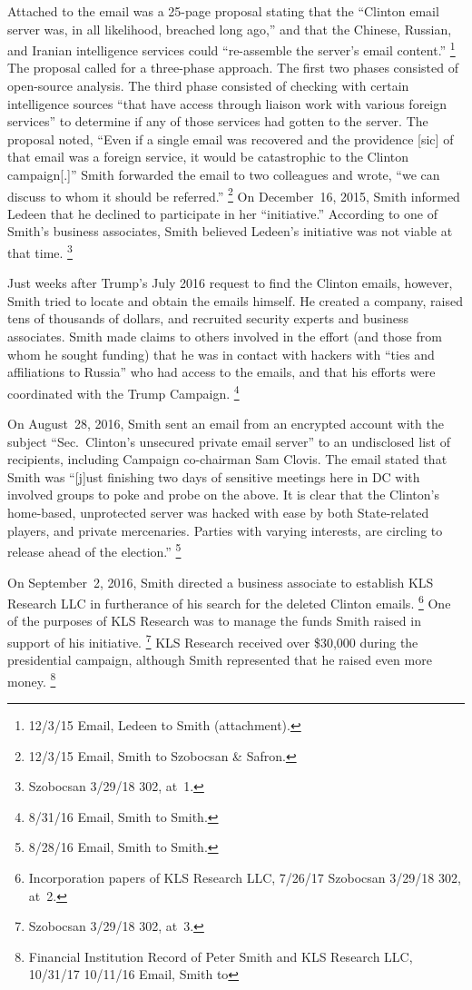 Attached to the email was a 25-page proposal stating that the ``Clinton email server was, in all likelihood, breached long ago,'' and that the Chinese, Russian, and Iranian intelligence services could ``re-assemble the server's email content.''%
\footnote{12/3/15 Email, Ledeen to Smith (attachment).}
The proposal called for a three-phase approach.
The first two phases consisted of open-source analysis.
The third phase consisted of checking with certain intelligence sources ``that have access through liaison work with various foreign services'' to determine if any of those services had gotten to the server.
The proposal noted, ``Even if a single email was recovered and the providence [sic] of that email was a foreign service, it would be catastrophic to the Clinton campaign[.]''
Smith forwarded the email to two colleagues and wrote, ``we can discuss to whom it should be referred.''%
\footnote{12/3/15 Email, Smith to Szobocsan \& Safron.}
On December~16, 2015, Smith informed Ledeen that he declined to participate in her ``initiative.''
According to one of Smith's business associates, Smith believed Ledeen's initiative was not viable at that time.%
\footnote{Szobocsan 3/29/18 302, at~1.}

Just weeks after Trump's July 2016 request to find the Clinton emails, however, Smith tried to locate and obtain the emails himself.
He created a company, raised tens of thousands of dollars, and recruited security experts and business associates.
Smith made claims to others involved in the effort (and those from whom he sought funding) that he was in contact with hackers with ``ties and affiliations to Russia'' who had access to the emails, and that his efforts were coordinated with the Trump Campaign.%
\footnote{8/31/16 Email, Smith to Smith.}

On August~28, 2016, Smith sent an email from an encrypted account with the subject ``Sec.~Clinton's unsecured private email server'' to an undisclosed list of recipients, including Campaign co-chairman Sam Clovis.
The email stated that Smith was ``[j]ust finishing two days of sensitive meetings here in DC with involved groups to poke and probe on the above.
It is clear that the Clinton's home-based, unprotected server was hacked with ease by both State-related players, and private mercenaries.
Parties with varying interests, are circling to release ahead of the election.''%
\footnote{8/28/16 Email, Smith to Smith.}

On September~2, 2016, Smith directed a business associate to establish KLS Research LLC in furtherance of his search for the deleted Clinton emails.%
\footnote{Incorporation papers of KLS Research LLC, 7/26/17 
Szobocsan 3/29/18 302, at~2.}
One of the purposes of KLS Research was to manage the funds Smith raised in support of his initiative.%
\footnote{Szobocsan 3/29/18 302, at~3.}
KLS Research received over \$30,000 during the presidential campaign, although Smith represented that he raised even more money.%
\footnote{Financial Institution Record of Peter Smith and KLS Research LLC, 10/31/17  10/11/16 Email, Smith to }

